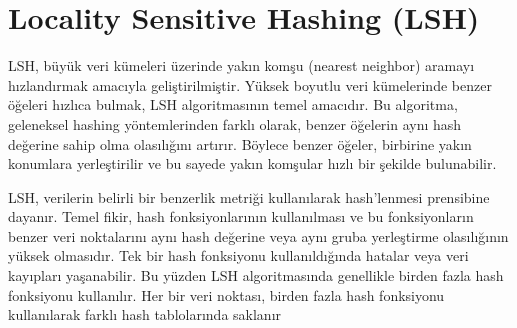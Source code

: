 \section{Locality Sensitive Hashing (LSH)}

LSH, büyük veri kümeleri üzerinde yakın komşu (nearest neighbor) aramayı hızlandırmak amacıyla geliştirilmiştir. Yüksek boyutlu veri kümelerinde benzer öğeleri hızlıca bulmak, LSH algoritmasının temel amacıdır. Bu algoritma, geleneksel hashing yöntemlerinden farklı olarak, benzer öğelerin aynı hash değerine sahip olma olasılığını artırır. Böylece benzer öğeler, birbirine yakın konumlara yerleştirilir ve bu sayede yakın komşular hızlı bir şekilde bulunabilir.

LSH, verilerin belirli bir benzerlik metriği kullanılarak hash'lenmesi prensibine dayanır. Temel fikir, hash fonksiyonlarının kullanılması ve bu fonksiyonların benzer veri noktalarını aynı hash değerine veya aynı gruba yerleştirme olasılığının yüksek olmasıdır. Tek bir hash fonksiyonu kullanıldığında hatalar veya veri kayıpları yaşanabilir. Bu yüzden LSH algoritmasında genellikle birden fazla hash fonksiyonu kullanılır. Her bir veri noktası, birden fazla hash fonksiyonu kullanılarak farklı hash tablolarında saklanır



\newpage